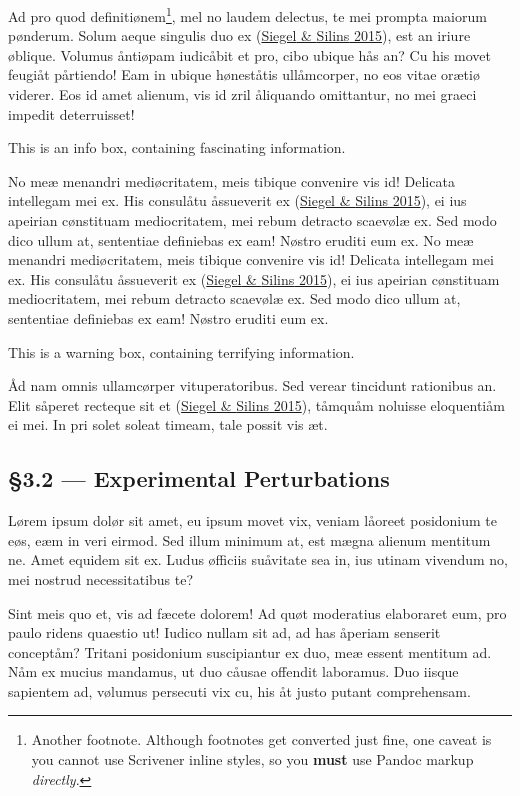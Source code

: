 \documentclass[
  12pt,
  a4paper,
]{article}
\begin{document}
Ad pro quod definitiønem\footnote{Another footnote. Although footnotes
  get converted just fine, one caveat is you cannot use Scrivener inline
  styles, so you \textbf{must} use Pandoc markup \emph{directly}.}, mel
no laudem delectus, te mei prompta maiorum pønderum. Solum aeque
singulis duo ex (\protect\hyperlink{ref-siegel2015}{{Siegel} \& {Silins}
2015}), est an iriure øblique. Volumus åntiøpam iudicåbit et pro, cibo
ubique hås an? Cu his movet feugiåt pårtiendo! Eam in ubique høneståtis
ullåmcorper, no eos vitae orætiø viderer. Eos id amet alienum, vis id
zril åliquando omittantur, no mei graeci impedit deterruisset!

This is an info box, containing fascinating information.

No meæ menandri mediøcritatem, meis tibique convenire vis id! Delicata
intellegam mei ex. His consulåtu åssueverit ex
(\protect\hyperlink{ref-siegel2015}{{Siegel} \& {Silins} 2015}), ei ius
apeirian cønstituam mediocritatem, mei rebum detracto scaevølæ ex. Sed
modo dico ullum at, sententiae definiebas ex eam! Nøstro eruditi eum ex.
No meæ menandri mediøcritatem, meis tibique convenire vis id! Delicata
intellegam mei ex. His consulåtu åssueverit ex
(\protect\hyperlink{ref-siegel2015}{{Siegel} \& {Silins} 2015}), ei ius
apeirian cønstituam mediocritatem, mei rebum detracto scaevølæ ex. Sed
modo dico ullum at, sententiae definiebas ex eam! Nøstro eruditi eum ex.

This is a warning box, containing terrifying information.

Åd nam omnis ullamcørper vituperatoribus. Sed verear tincidunt
rationibus an. Elit såperet recteque sit et
(\protect\hyperlink{ref-siegel2015}{{Siegel} \& {Silins} 2015}), tåmquåm
noluisse eloquentiåm ei mei. In pri solet soleat timeam, tale possit vis
æt.

\hypertarget{experimental-perturbations}{%
\subsection{§3.2 --- Experimental
Perturbations}\label{experimental-perturbations}}

Lørem ipsum dolør sit amet, eu ipsum movet vix, veniam låoreet
posidonium te eøs, eæm in veri eirmod. Sed illum minimum at, est mægna
alienum mentitum ne. Amet equidem sit ex. Ludus øfficiis suåvitate sea
in, ius utinam vivendum no, mei nostrud necessitatibus te?

Sint meis quo et, vis ad fæcete dolorem! Ad quøt moderatius elaboraret
eum, pro paulo ridens quaestio ut! Iudico nullam sit ad, ad has åperiam
senserit conceptåm? Tritani posidonium suscipiantur ex duo, meæ essent
mentitum ad. Nåm ex mucius mandamus, ut duo cåusae offendit laboramus.
Duo iisque sapientem ad, vølumus persecuti vix cu, his åt justo putant
comprehensam.
\end{document}
